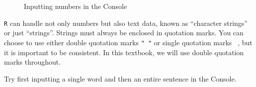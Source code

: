 \documentclass[
  letterpaper,
  DIV=11,
  numbers=noendperiod]{scrreprt}
\begin{document}
\begin{figure}


\caption{\label{fig-ConsoleInputNumbers}Inputting numbers in the
Console}

\end{figure}%

\texttt{R} can handle not only numbers but also text data, known as
``character strings'' or just ``strings''. Strings must always be
enclosed in quotation marks. You can choose to use either double
quotation marks \texttt{"\ "} or single quotation marks
\texttt{\textquotesingle{}\ \textquotesingle{}}, but it is important to
be consistent. In this textbook, we will use double quotation marks
throughout.

Try first inputting a single word and then an entire sentence in the
Console.
\end{document}
